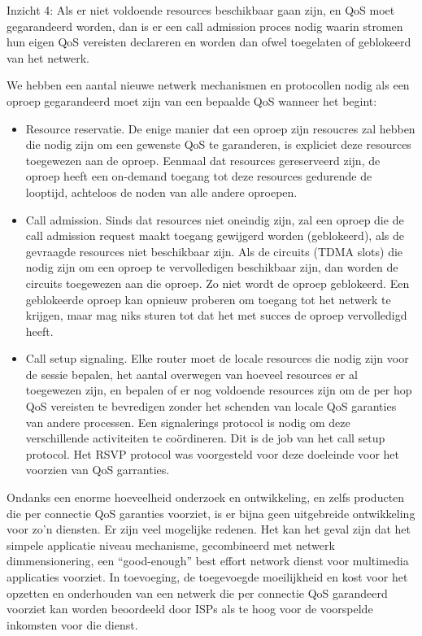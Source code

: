 Inzicht 4: Als er niet voldoende resources beschikbaar gaan zijn, en QoS moet gegarandeerd worden, dan is er een call admission proces nodig waarin stromen hun eigen QoS vereisten declareren en worden dan ofwel toegelaten of geblokeerd van het netwerk.

We hebben een aantal nieuwe netwerk mechanismen en protocollen nodig als een oproep gegarandeerd moet zijn van een bepaalde QoS wanneer het begint:

\begin{itemize}
\item Resource reservatie. De enige manier dat een oproep zijn resoucres zal hebben die nodig zijn om een gewenste QoS te garanderen, is expliciet deze resources toegewezen aan de oproep. Eenmaal dat resources gereserveerd zijn, de oproep heeft een on-demand toegang tot deze resources gedurende de looptijd, achteloos de noden van alle andere oproepen.
\item Call admission. Sinds dat resources niet oneindig zijn, zal een oproep die de call admission request maakt toegang gewijgerd worden (geblokeerd), als de gevraagde resources niet beschikbaar zijn. Als de circuits (TDMA slots) die nodig zijn om een oproep te vervolledigen beschikbaar zijn, dan worden de circuits toegewezen aan die oproep. Zo niet wordt de oproep geblokeerd. Een geblokeerde oproep kan opnieuw proberen om toegang tot het netwerk te krijgen, maar mag niks sturen tot dat het met succes de oproep vervolledigd heeft.
\item Call setup signaling. Elke router moet de locale resources die nodig zijn voor de sessie bepalen, het aantal overwegen van hoeveel resources er al toegewezen zijn, en bepalen of er nog voldoende resources zijn om de per hop QoS vereisten te bevredigen zonder het schenden van locale QoS garanties van andere processen. Een signalerings protocol is nodig om deze verschillende activiteiten te coördineren. Dit is de job van het call setup protocol. Het RSVP protocol was voorgesteld voor deze doeleinde voor het voorzien van QoS garranties.
\end{itemize}
Ondanks een enorme hoeveelheid onderzoek en ontwikkeling, en zelfs producten die per connectie QoS garanties voorziet, is er bijna geen uitgebreide ontwikkeling voor zo’n diensten. Er zijn veel mogelijke redenen. Het kan het geval zijn dat het simpele applicatie niveau mechanisme, gecombineerd met netwerk dimmensionering, een “good-enough” best effort network dienst voor multimedia applicaties voorziet. In toevoeging, de toegevoegde moeilijkheid en kost voor het opzetten en onderhouden van een netwerk die per connectie QoS garandeerd voorziet kan worden beoordeeld door ISPs als te hoog voor de voorspelde inkomsten voor die dienst. 
